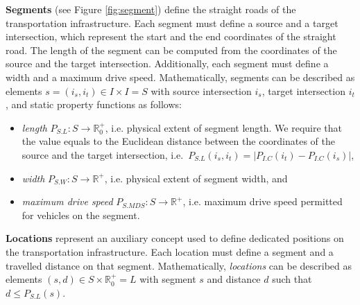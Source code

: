 \documentclass[graybox]{svmult}
\begin{document}
\noindent
\textbf{Segments} (see Figure \ref{fig:segment})
define the straight roads of the transportation infrastructure.
Each segment must define a source and a target intersection, which represent the start and the end coordinates of the straight road.
The length of the segment can be computed from the coordinates of the source and the target intersection.
Additionally, each segment must define a width and a maximum drive speed.
Mathematically, segments can be described as elements $s = (i_s, i_t) \in I \times I = S$ with source intersection $i_s$, target intersection $i_t$, and static property functions as follows:
\begin{itemize}
	\item \textit{length} $P_{S.L}: S \rightarrow \mathbb{R}_0^+$, i.e. physical extent of segment length. We require that the value equals to the Euclidean distance between the coordinates of the source and the target intersection, i.e.\ $P_{S.L}(i_s, i_t) = |P_{I.C}(i_t) - P_{I.C}(i_s)|$,
	\item \textit{width} $P_{S.W}: S \rightarrow \mathbb{R}^+$, i.e. physical extent of segment width, and
	\item \textit{maximum drive speed} $P_{S.MDS}: S \rightarrow \mathbb{R}^+$, i.e. maximum drive speed permitted for vehicles on the segment.
\end{itemize}
\vspace{-2mm}


\vspace{4mm}
\noindent
\textbf{Locations}
represent an auxiliary concept used to define dedicated positions on the transportation infrastructure.
Each location must define a segment and a travelled distance on that segment.
Mathematically, \textit{locations} can be described as elements $(s, d) \in S \times \mathbb{R}_0^+ = L$ with segment $s$ and distance $d$ such that $d \leq P_{S.L}(s)$.

\end{document}
